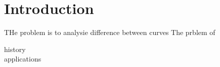 
\section{Introduction}
THe problem is to analysie difference between curves
The prblem of

history \\
applications  \\
